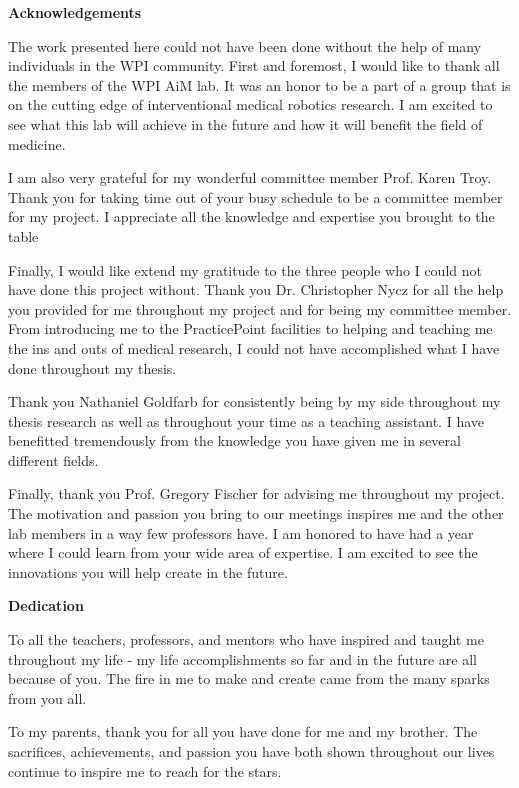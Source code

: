 \begin{center}
    \textbf{Acknowledgements}
\end{center}

The work presented here could not have been done without the help of many individuals in the WPI community. First and foremost, I would like to thank all the members of the WPI AiM lab. It was an honor to be a part of a group that is on the cutting edge of interventional medical robotics research. I am excited to see what this lab will achieve in the future and how it will benefit the field of medicine.

I am also very grateful for my wonderful committee member Prof. Karen Troy. Thank you for taking time out of your busy schedule to be a committee member for my project. I appreciate all the knowledge and expertise you brought to the table

Finally, I would like extend my gratitude to the three people who I could not have done this project without. Thank you Dr. Christopher Nycz for all the help you provided for me throughout my project and for being my committee member. From introducing me to the PracticePoint facilities to helping and teaching me the ins and outs of medical research, I could not have accomplished what I have done throughout my thesis.

Thank you Nathaniel Goldfarb for consistently being by my side throughout my thesis research as well as throughout your time as a teaching assistant. I have benefitted tremendously from the knowledge you have given me in several different fields.

Finally, thank you Prof. Gregory Fischer for advising me throughout my project. The motivation and passion you bring to our meetings inspires me and the other lab members in a way few professors have. I am honored to have had a year where I could learn from your wide area of expertise. I am excited to see the innovations you will help create in the future.

\newpage
\begin{center}
    \textbf{Dedication}
\end{center}

To all the teachers, professors, and mentors who have inspired and taught me throughout my life - my life accomplishments so far and in the future are all because of you. The fire in me to make and create came from the many sparks from you all.

To my parents, thank you for all you have done for me and my brother. The sacrifices, achievements, and passion you have both shown throughout our lives continue to inspire me to reach for the stars.